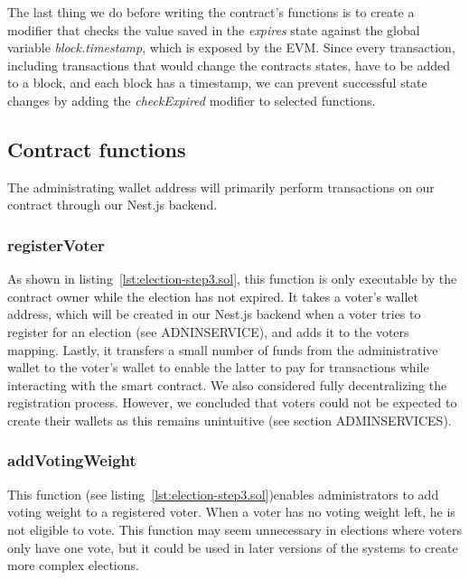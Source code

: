 The last thing we do before writing the contract's functions is to create a modifier that checks the value saved in the \emph{expires} state against the global variable \emph{block.timestamp}, which is exposed by the \gls{EVM}.
Since every transaction, including transactions that would change the contracts states, have to be added to a block, and each block has a timestamp, we can prevent successful state changes by adding the \emph{checkExpired} modifier to selected functions.

\subsection{Contract functions}\label{subsec:contract-functions}

The administrating wallet address will primarily perform transactions on our contract through our Nest.js backend.


\subsubsection{registerVoter}

As shown in listing~\ref{lst:election-step3.sol}, this function is only executable by the contract owner while the election has not expired.
It takes a voter’s wallet address, which will be created in our Nest.js backend when a voter tries to register for an election (see ADNINSERVICE), and adds it to the voters mapping.
Lastly, it transfers a small number of funds from the administrative wallet to the voter’s wallet to enable the latter to pay for transactions while interacting with the smart contract.
We also considered fully decentralizing the registration process.
However, we concluded that voters could not be expected to create their wallets as this remains unintuitive (see section ADMINSERVICES).

\subsubsection{addVotingWeight}

This function (see listing~\ref{lst:election-step3.sol})enables administrators to add voting weight to a registered voter.
When a voter has no voting weight left, he is not eligible to vote.
This function may seem unnecessary in elections where voters only have one vote, but it could be used in later versions of the systems to create more complex elections.

